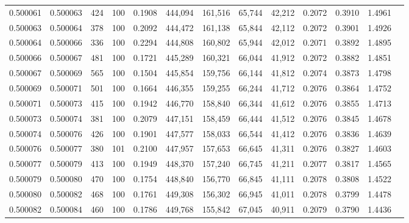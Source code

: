\begin{tabular}{rrrrrrrrrrrrr}
0.500061 & 0.500063 &   424 & 100 &                                     0.1908 & 444,094 & 161,516 &  65,744 &  42,212 & 0.2072 & 0.3910 & 1.4961 \\
0.500063 & 0.500064 &   378 & 100 &                                     0.2092 & 444,472 & 161,138 &  65,844 &  42,112 & 0.2072 & 0.3901 & 1.4926 \\
0.500064 & 0.500066 &   336 & 100 &                                     0.2294 & 444,808 & 160,802 &  65,944 &  42,012 & 0.2071 & 0.3892 & 1.4895 \\
0.500066 & 0.500067 &   481 & 100 &                                     0.1721 & 445,289 & 160,321 &  66,044 &  41,912 & 0.2072 & 0.3882 & 1.4851 \\
0.500067 & 0.500069 &   565 & 100 &                                     0.1504 & 445,854 & 159,756 &  66,144 &  41,812 & 0.2074 & 0.3873 & 1.4798 \\
0.500069 & 0.500071 &   501 & 100 &                                     0.1664 & 446,355 & 159,255 &  66,244 &  41,712 & 0.2076 & 0.3864 & 1.4752 \\
0.500071 & 0.500073 &   415 & 100 &                                     0.1942 & 446,770 & 158,840 &  66,344 &  41,612 & 0.2076 & 0.3855 & 1.4713 \\
0.500073 & 0.500074 &   381 & 100 &                                     0.2079 & 447,151 & 158,459 &  66,444 &  41,512 & 0.2076 & 0.3845 & 1.4678 \\
0.500074 & 0.500076 &   426 & 100 &                                     0.1901 & 447,577 & 158,033 &  66,544 &  41,412 & 0.2076 & 0.3836 & 1.4639 \\
0.500076 & 0.500077 &   380 & 101 &                                     0.2100 & 447,957 & 157,653 &  66,645 &  41,311 & 0.2076 & 0.3827 & 1.4603 \\
0.500077 & 0.500079 &   413 & 100 &                                     0.1949 & 448,370 & 157,240 &  66,745 &  41,211 & 0.2077 & 0.3817 & 1.4565 \\
0.500079 & 0.500080 &   470 & 100 &                                     0.1754 & 448,840 & 156,770 &  66,845 &  41,111 & 0.2078 & 0.3808 & 1.4522 \\
0.500080 & 0.500082 &   468 & 100 &                                     0.1761 & 449,308 & 156,302 &  66,945 &  41,011 & 0.2078 & 0.3799 & 1.4478 \\
0.500082 & 0.500084 &   460 & 100 &                                     0.1786 & 449,768 & 155,842 &  67,045 &  40,911 & 0.2079 & 0.3790 & 1.4436 \\

\end{tabular}
